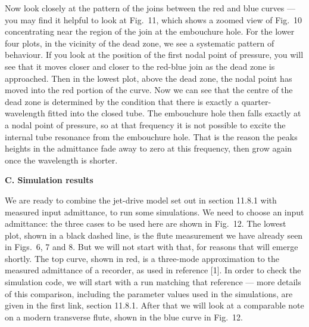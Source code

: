   Now look closely at the pattern of the joins between the red and blue curves 
  — you may find it helpful to look at Fig.\ 11, which shows a zoomed view of 
  Fig.\ 10 concentrating near the region of the join at the embouchure hole. 
  For the lower four plots, in the vicinity of the dead zone, we see a 
  systematic pattern of behaviour. If you look at the position of the first 
  nodal point of pressure, you will see that it moves closer and closer to the 
  red-blue join as the dead zone is approached. Then in the lowest plot, above 
  the dead zone, the nodal point has moved into the red portion of the curve. 
  Now we can see that the centre of the dead zone is determined by the 
  condition that there is exactly a quarter-wavelength fitted into the closed 
  tube. The embouchure hole then falls exactly at a nodal point of pressure, so 
  at that frequency it is not possible to excite the internal tube resonance 
  from the embouchure hole. That is the reason the peaks heights in the 
  admittance fade away to zero at this frequency, then grow again once the 
  wavelength is shorter. 


  \textbf{C. Simulation results} 

  We are ready to combine the jet-drive model set out in section 11.8.1 with 
  measured input admittance, to run some simulations. We need to choose an 
  input admittance: the three cases to be used here are shown in Fig.\ 12. The 
  lowest plot, shown in a black dashed line, is the flute measurement we have 
  already seen in Figs.\ 6, 7 and 8. But we will not start with that, for 
  reasons that will emerge shortly. The top curve, shown in red, is a 
  three-mode approximation to the measured admittance of a recorder, as used in 
  reference [1]. In order to check the simulation code, we will start with a 
  run matching that reference --- more details of this comparison, including 
  the parameter values used in the simulations, are given in the first link, 
  section 11.8.1. After that we will look at a comparable note on a modern 
  transverse flute, shown in the blue curve in Fig.\ 12. 


